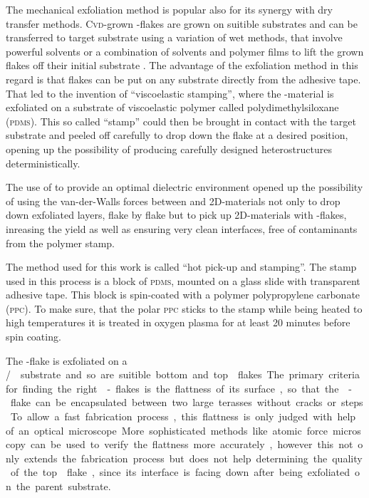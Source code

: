 The mechanical exfoliation method is popular also for its synergy with dry transfer methods. \textsc{Cvd}-grown \tmd-flakes are grown on suitible substrates and can be transferred to target substrate using a variation of wet methods, that involve powerful solvents or a combination of solvents and polymer films to lift the grown flakes off their initial substrate \cite{li_universal_2014}. The advantage of the exfoliation method in this regard is that flakes can be put on any substrate directly from the adhesive tape. That led to the invention of ``viscoelastic stamping'', where the \tmd-material is exfoliated on a substrate of viscoelastic polymer called polydimethylsiloxane (\textsc{pdms})\cite{castellanos-gomez_deterministic_2014}. This so called ``stamp'' could then be brought in contact with the target substrate and peeled off carefully to drop down the flake at a desired position, opening up the possibility of producing carefully designed heterostructures deterministically.

The use of \hbng to provide an optimal dielectric environment opened up the possibility of using the van-der-Walls forces between \hbn and 2D-materials not only to drop down exfoliated layers, flake by flake but to pick up 2D-materials with \hbn-flakes, inreasing the yield as well as ensuring very clean interfaces, free of contaminants from the polymer stamp. 

The method used for this work is called ``hot pick-up and stamping''\cite{pizzocchero_hot_2016, tien_study_2016}. The stamp used in this process is a block of \textsc{pdms}, mounted on a glass slide with transparent adhesive tape. This block is spin-coated with a polymer polypropylene carbonate (\textsc{ppc}). To make sure, that the polar \textsc{ppc} sticks to the stamp while being heated to high temperatures it is treated in oxygen plasma for at least 20 minutes before spin coating\cite{jung_adhesion_2016}.

The \tmd-flake is exfoliated on a \si/\sio substrate and so are suitible bottom and top \hbn flakes. The primary criteria for finding the right \hbn-flakes is the flattness of its surface, so that the \tmd-flake can be encapsulated between two large terasses without cracks or steps. To allow a fast fabrication process, this flattness is only judged with help of an optical microscope. More sophisticated methods like atomic force microscopy can be used to verify the flattness more accurately, however this not only extends the fabrication process but does not help determining the quality of the top \hbn flake, since its interface is facing down after being exfoliated on the parent substrate.

